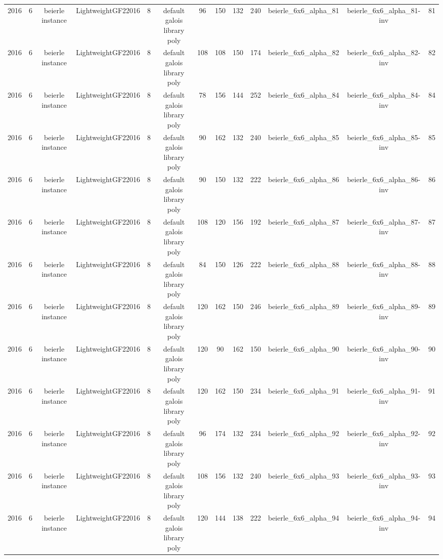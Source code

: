 \begin{tabular}{c c c c c c c c c c c c c}
2016 & 6 & beierle instance & LightweightGF22016 & 8 & default galois library poly & 96 & 150 & 132 & 240 & beierle_6x6_alpha_81 & beierle_6x6_alpha_81-inv & 81 \\
2016 & 6 & beierle instance & LightweightGF22016 & 8 & default galois library poly & 108 & 108 & 150 & 174 & beierle_6x6_alpha_82 & beierle_6x6_alpha_82-inv & 82 \\
2016 & 6 & beierle instance & LightweightGF22016 & 8 & default galois library poly & 78 & 156 & 144 & 252 & beierle_6x6_alpha_84 & beierle_6x6_alpha_84-inv & 84 \\
2016 & 6 & beierle instance & LightweightGF22016 & 8 & default galois library poly & 90 & 162 & 132 & 240 & beierle_6x6_alpha_85 & beierle_6x6_alpha_85-inv & 85 \\
2016 & 6 & beierle instance & LightweightGF22016 & 8 & default galois library poly & 90 & 150 & 132 & 222 & beierle_6x6_alpha_86 & beierle_6x6_alpha_86-inv & 86 \\
2016 & 6 & beierle instance & LightweightGF22016 & 8 & default galois library poly & 108 & 120 & 156 & 192 & beierle_6x6_alpha_87 & beierle_6x6_alpha_87-inv & 87 \\
2016 & 6 & beierle instance & LightweightGF22016 & 8 & default galois library poly & 84 & 150 & 126 & 222 & beierle_6x6_alpha_88 & beierle_6x6_alpha_88-inv & 88 \\
2016 & 6 & beierle instance & LightweightGF22016 & 8 & default galois library poly & 120 & 162 & 150 & 246 & beierle_6x6_alpha_89 & beierle_6x6_alpha_89-inv & 89 \\
2016 & 6 & beierle instance & LightweightGF22016 & 8 & default galois library poly & 120 & 90 & 162 & 150 & beierle_6x6_alpha_90 & beierle_6x6_alpha_90-inv & 90 \\
2016 & 6 & beierle instance & LightweightGF22016 & 8 & default galois library poly & 120 & 162 & 150 & 234 & beierle_6x6_alpha_91 & beierle_6x6_alpha_91-inv & 91 \\
2016 & 6 & beierle instance & LightweightGF22016 & 8 & default galois library poly & 96 & 174 & 132 & 234 & beierle_6x6_alpha_92 & beierle_6x6_alpha_92-inv & 92 \\
2016 & 6 & beierle instance & LightweightGF22016 & 8 & default galois library poly & 108 & 156 & 132 & 240 & beierle_6x6_alpha_93 & beierle_6x6_alpha_93-inv & 93 \\
2016 & 6 & beierle instance & LightweightGF22016 & 8 & default galois library poly & 120 & 144 & 138 & 222 & beierle_6x6_alpha_94 & beierle_6x6_alpha_94-inv & 94 \\

\end{tabular}
